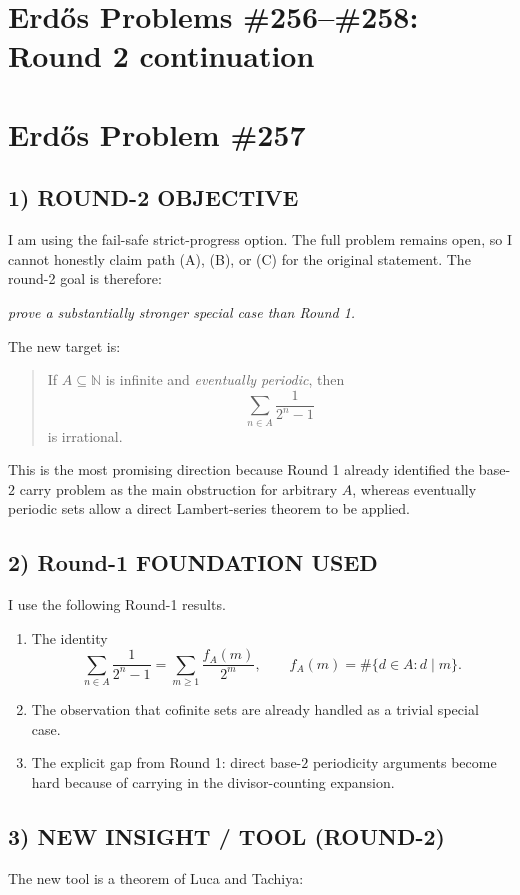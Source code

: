 \section*{Erd\H{o}s Problems \#256--\#258: Round 2 continuation}

\section*{Erd\H{o}s Problem \#257}

\subsection*{1) ROUND-2 OBJECTIVE}
I am using the fail-safe strict-progress option. The full problem remains open, so I cannot honestly claim path (A), (B), or (C) for the original statement. The round-2 goal is therefore:

\medskip
\centerline{\emph{prove a substantially stronger special case than Round 1.}}
\medskip

The new target is:

\begin{quote}
If $A\subseteq \mathbb{N}$ is infinite and \emph{eventually periodic}, then
\[
\sum_{n\in A}\frac{1}{2^n-1}
\]
is irrational.
\end{quote}

This is the most promising direction because Round 1 already identified the base-$2$ carry problem as the main obstruction for arbitrary $A$, whereas eventually periodic sets allow a direct Lambert-series theorem to be applied.

\subsection*{2) Round-1 FOUNDATION USED}
I use the following Round-1 results.
\begin{enumerate}
\item The identity
\[
\sum_{n\in A}\frac{1}{2^n-1}=\sum_{m\ge 1}\frac{f_A(m)}{2^m},
\qquad
f_A(m)=\#\{d\in A:d\mid m\}.
\]
\item The observation that cofinite sets are already handled as a trivial special case.
\item The explicit gap from Round 1: direct base-$2$ periodicity arguments become hard because of carrying in the divisor-counting expansion.
\end{enumerate}

\subsection*{3) NEW INSIGHT / TOOL (ROUND-2)}
The new tool is a theorem of Luca and Tachiya:

